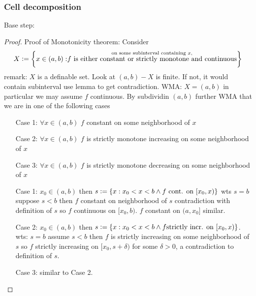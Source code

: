 \subsubsection{Cell decomposition}
Base step: 

\begin{proof}
    Proof of Monotonicity theorem:
    Consider $$X \vcentcolon= \biggl\{x\in (a,b) : \stackrel{\text{on some subinterval containing $x$,}}
    {\text{$f$ is either constant or strictly monotone and continuous}} \biggr\}$$
    remark: $X$ is a definable set.
    Look at $(a,b)-X$ is finite. If not, it would contain subinterval use lemma to get contradiction.
    WMA: $X = (a,b)$ in particular we may assume $f$ continuous.
    By subdividin $(a,b)$ further WMA that we are in one of the following cases
    \begin{enumerate}
        \item[Case 1:] $\forall x \in (a,b)$ $f$ constant on some neighborhood of $x$
        \item[Case 2:] $\forall x \in (a,b)$ $f$ is strictly monotone increasing on some neighborhood 
        of $x$
        \item[Case 3:] $\forall x \in (a,b)$ $f$ is strictly monotone decreasing on some neighborhood 
        of $x$
    \end{enumerate}
    \begin{enumerate}
        \item[Case 1:] $x_0 \in (a,b)$ then 
        $s \vcentcolon= \{ x: x_0<x<b \land f \text{ cont. on $[x_0,x)$}\}$
        wts $s=b$ suppose $s<b$ then $f$ constant on neighborhood of $s$ contradiction with 
        definition of $s$ so $f$ continuous on $[x_0,b)$. $f$ constant on $(a,x_0]$ similar.
        \item[Case 2:] $x_0\in (a,b)$ then $s\vcentcolon= \{x: x_0<x<b \land f \text{strictly incr. on } 
        [x_0,x) \}$. wts: $s=b$ assume $s<b$ then $f$ is strictly increasing on some neighborhood of 
        $s$ so $f$ strictly increasing on $[x_0,s+\delta)$ for some $\delta>0$, a contradiction to 
        definition of $s$. 
        \item[Case 3:] similar to Case 2. 
    \end{enumerate}
\end{proof}

